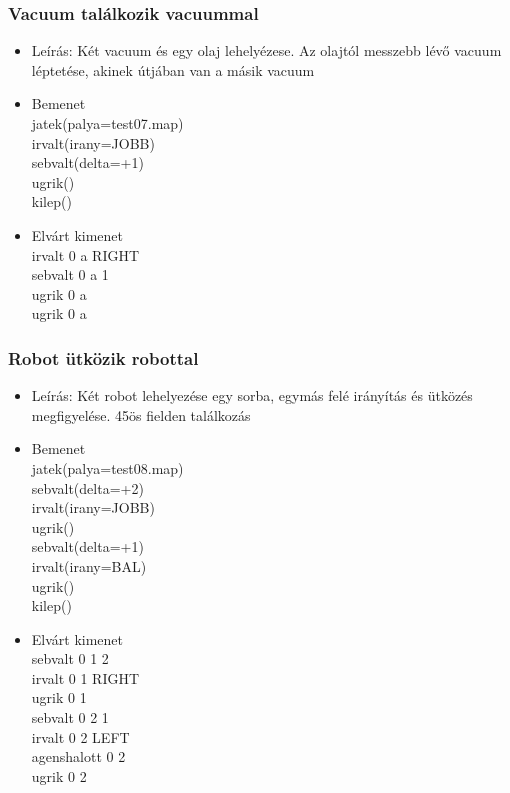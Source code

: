 \subsubsection{Vacuum találkozik vacuummal}
\begin{itemize}
	\item Leírás: Két vacuum és egy olaj lehelyézese. Az olajtól messzebb lévő vacuum léptetése, akinek útjában van a másik vacuum
	\item Bemenet\\
    jatek(palya=test07.map)\\
    irvalt(irany=JOBB)\\
    sebvalt(delta=+1)\\
    ugrik()\\
    kilep()\\
	\item Elvárt kimenet\\
    irvalt 0 a RIGHT \\
    sebvalt 0 a 1 \\ 
    ugrik 0 a \\
    ugrik 0 a \\
    

\end{itemize}

\subsubsection{Robot ütközik robottal}
\begin{itemize}
	\item Leírás: Két robot lehelyezése egy sorba, egymás felé irányítás és ütközés megfigyelése. 45ös fielden találkozás
	\item Bemenet\\
    jatek(palya=test08.map)\\
    sebvalt(delta=+2)\\
    irvalt(irany=JOBB)\\
    ugrik()\\
    sebvalt(delta=+1)\\
    irvalt(irany=BAL)\\
    ugrik()\\
    kilep()\\
	\item Elvárt kimenet\\
    sebvalt 0 1 2 \\
    irvalt 0 1 RIGHT \\
    ugrik 0 1 \\
    sebvalt 0 2 1 \\
    irvalt 0 2 LEFT \\
    agenshalott 0 2 \\
    ugrik 0 2 \\
    

\end{itemize}

